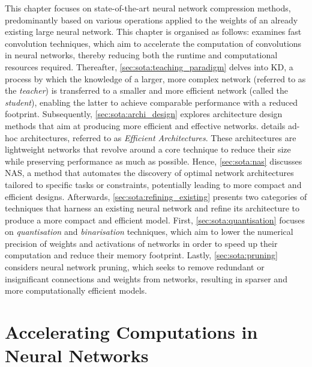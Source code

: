 This chapter focuses on state-of-the-art neural network compression methods,
predominantly based on various operations applied to the weights of an already
existing large neural network. This chapter is organised as follows:
 examines fast convolution techniques, which
aim to accelerate the computation of convolutions in neural networks, thereby
reducing both the runtime and computational resources required. Thereafter,
\cref{sec:sota:teaching_paradigm} delves into \ac{KD}, a process by which the
knowledge of a larger, more complex network (referred to as the \emph{teacher})
is transferred to a smaller and more efficient network (called the
\emph{student}), enabling the latter to achieve comparable performance with a
reduced footprint. Subsequently, \cref{sec:sota:archi_design} explores
architecture design methods that aim at producing more efficient and effective
networks.  details ad-hoc architectures, referred
to as \emph{Efficient Architectures}. These architectures are lightweight
networks that revolve around a core technique to reduce their size while
preserving performance as much as possible. Hence, \cref{sec:sota:nas} discusses
\ac{NAS}, a method that automates the discovery of optimal network architectures
tailored to specific tasks or constraints, potentially leading to more compact
and efficient designs. Afterwards, \cref{sec:sota:refining_existing} presents
two categories of techniques that harness an existing neural network and refine
its architecture to produce a more compact and efficient model. First,
\cref{sec:sota:quantisation} focuses on \emph{quantisation} and
\emph{binarisation} techniques, which aim to lower the numerical precision of
weights and activations of networks in order to speed up their computation and
reduce their memory footprint. Lastly, \cref{sec:sota:pruning} considers neural
network pruning, which seeks to remove redundant or insignificant connections and
weights from networks, resulting in sparser and more computationally efficient
models.\\



\section{Accelerating Computations in Neural Networks}\label{sec:sota:fast_convolutions}

